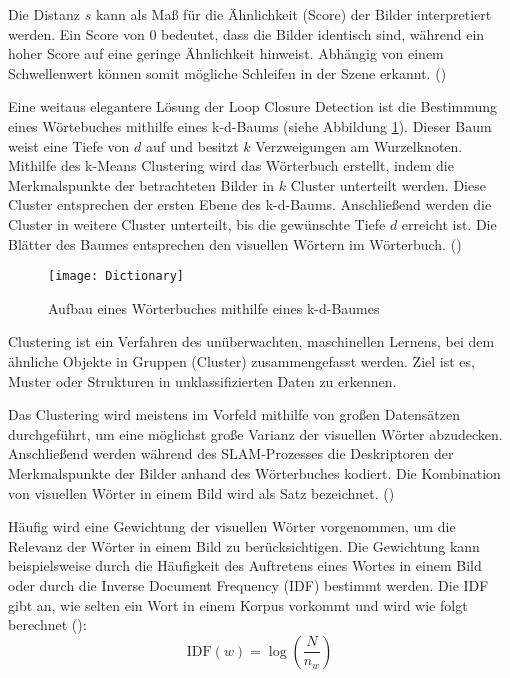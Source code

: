 Die Distanz \( s \) kann als Maß für die Ähnlichkeit (Score) der Bilder interpretiert werden. Ein Score von 0 bedeutet, dass die Bilder identisch sind, während ein hoher Score auf eine geringe Ähnlichkeit hinweist. Abhängig von einem Schwellenwert können somit mögliche Schleifen in der Szene erkannt. (\cite{gao2021vSLAM})

Eine weitaus elegantere Lösung der Loop Closure Detection ist die Bestimmung eines Wörtebuches mithilfe eines k-d-Baums (siehe Abbildung \ref{fig:Dictionary}). Dieser Baum weist eine Tiefe von \( d \) auf und besitzt \( k \) Verzweigungen am Wurzelknoten. Mithilfe des k-Means Clustering wird das Wörterbuch erstellt, indem die Merkmalspunkte der betrachteten Bilder in \( k \) Cluster unterteilt werden. Diese Cluster entsprechen der ersten Ebene des k-d-Baums. Anschließend werden die Cluster in weitere Cluster unterteilt, bis die gewünschte Tiefe \( d \) erreicht ist. Die Blätter des Baumes entsprechen den visuellen Wörtern im Wörterbuch. (\cite{gao2021vSLAM})

\begin{figure}
    \centering
    \texttt{[image: Dictionary]}
    \caption{Aufbau eines Wörterbuches mithilfe eines k-d-Baumes\label{fig:Dictionary}}\par
\end{figure}

\begin{tcolorbox}[colback=THAi-Blue!20!white, colframe=THAi-Blue]
    Clustering ist ein Verfahren des unüberwachten, maschinellen Lernens, bei dem ähnliche Objekte in Gruppen (Cluster) zusammengefasst werden. Ziel ist es, Muster oder Strukturen in unklassifizierten Daten zu erkennen. \cite{wikipedia2025clusteranalyse}
\end{tcolorbox}

Das Clustering wird meistens im Vorfeld mithilfe von großen Datensätzen durchgeführt, um eine möglichst große Varianz der visuellen Wörter abzudecken. Anschließend werden während des SLAM-Prozesses die Deskriptoren der Merkmalspunkte der Bilder anhand des Wörterbuches kodiert. Die Kombination von visuellen Wörter in einem Bild wird als Satz bezeichnet. (\cite{gao2021vSLAM})

Häufig wird eine Gewichtung der visuellen Wörter vorgenommen, um die Relevanz der Wörter in einem Bild zu berücksichtigen. Die Gewichtung kann beispielsweise durch die Häufigkeit des Auftretens eines Wortes in einem Bild oder durch die Inverse Document Frequency (IDF) bestimmt werden. Die IDF gibt an, wie selten ein Wort in einem Korpus vorkommt und wird wie folgt berechnet (\cite{gao2021vSLAM}):
\begin{equation}
    \text{IDF}(w) = \log \left( \frac{N}{n_w} \right)
\end{equation}

